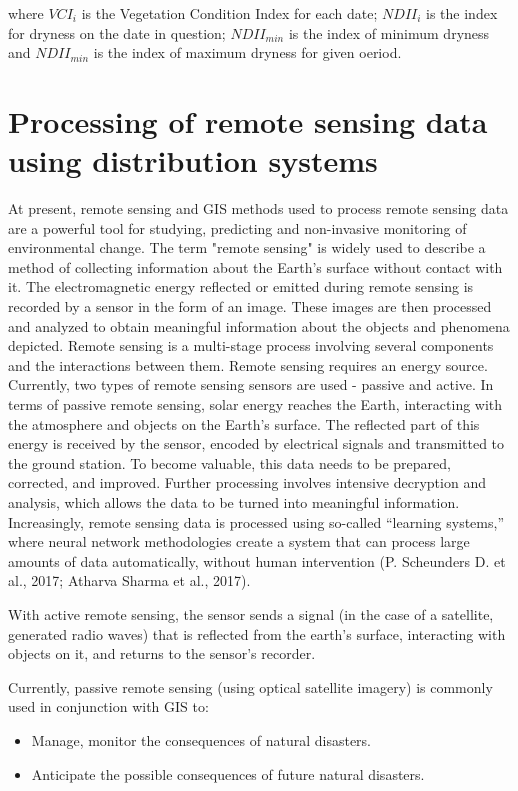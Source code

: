 {{{	where $VCI_{i}$ is the Vegetation Condition Index for each date; $NDII_{i}$ is the index for dryness on the date in question; $NDII_{min}$ is the index of minimum dryness and $NDII_{min}$ is the index of maximum dryness for given oeriod.

\section{Processing of remote sensing data using distribution systems}
	At present, remote sensing and GIS methods used to process remote sensing data are a powerful tool for studying, predicting and non-invasive monitoring of environmental change.
	The term "remote sensing" is widely used to describe a method of collecting information about the Earth's surface without contact with it. The electromagnetic energy reflected or emitted during remote sensing is recorded by a sensor in the form of an image. These images are then processed and analyzed to obtain meaningful information about the objects and phenomena depicted. Remote sensing is a multi-stage process involving several components and the interactions between them. Remote sensing requires an energy source. Currently, two types of remote sensing sensors are used - passive and active. In terms of passive remote sensing, solar energy reaches the Earth, interacting with the atmosphere and objects on the Earth’s surface. The reflected part of this energy is received by the sensor, encoded by electrical signals and transmitted to the ground station. To become valuable, this data needs to be prepared, corrected, and improved. Further processing involves intensive decryption and analysis, which allows the data to be turned into meaningful information. Increasingly, remote sensing data is processed using so-called “learning systems,” where neural network methodologies create a system that can process large amounts of data automatically, without human intervention (P. Scheunders D. et al., 2017; Atharva Sharma et al., 2017).
	
	With active remote sensing, the sensor sends a signal (in the case of a satellite, generated radio waves) that is reflected from the earth's surface, interacting with objects on it, and returns to the sensor's recorder.
	
	Currently, passive remote sensing (using optical satellite imagery) is commonly used in conjunction with GIS to:

	\begin{itemize}
		\item Manage, monitor the consequences of natural disasters.
		\item Anticipate the possible consequences of future natural disasters.
	\end{itemize}
	
}}}
